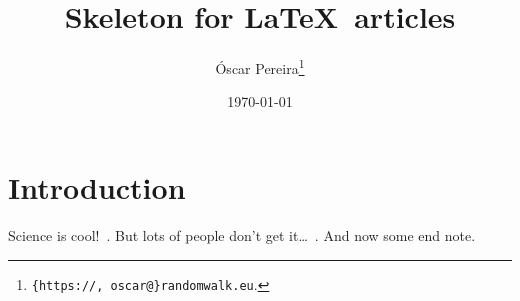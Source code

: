 \documentclass[a4paper,12pt,dvipsnames*]{report}
\title{
Skeleton for \LaTeX\ articles  %
}
\author{
  {Óscar Pereira}\footnote{\texttt{\{https://, oscar@\}randomwalk.eu}.}
}
\date{\today}
\begin{document}
\maketitle

\tableofcontents

\chapter{Introduction}
\label{chap:intro}
Science is cool!~\cite{Sagan}. But lots of people don't get it\ldots~\cite{Feynman74}. And now some end note.

\clearpage
{}
\printendnotes

\clearpage
{}
{}


\end{document}
